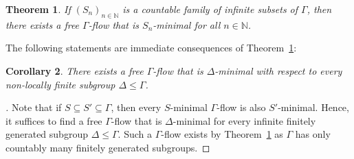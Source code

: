 \documentclass[11pt,reqno,psamsfonts]{amsart}
\theoremstyle{bfnote}
\newtheorem{theo}{Theorem}[section]
\newtheorem{corl}[theo]{Corollary}
\theoremstyle{definition}
\theoremstyle{remark}
\newcommand{\0}{\varnothing}
\renewcommand{\leq}{\leqslant}
\newcommand{\bemph}[1]{{\normalfont#1}}
\newcommand{\ep}[1]{\bemph{(}#1\bemph{)}}
\newcommand{\emphd}[1]{{\fontseries{b}\selectfont\textsf{#1}}}
\newcommand{\G}{\Gamma}
\newcommand{\N}{\mathbb{N}}
\numberwithin{equation}{section}
\newenvironment{scproof}[1][]{\begin{proof}[\textsc{\upshape{Proof}}#1]}{\end{proof}}
\begin{document}
    \begin{tcolorbox}
    \begin{theo}\label{theo:main}
        If $(S_n)_{n \in \N}$ is a countable family of infinite subsets of $\G$, then there exists a free $\G$-flow %
        that is $S_n$-minimal for all $n \in \N$.
    \end{theo}
    \end{tcolorbox}



    
    The following statements are immediate consequences of Theorem~\ref{theo:main}:

    \begin{tcolorbox}
    \begin{corl}\label{corl:fg_subgroups}
        There exists a free $\G$-flow %
        that is $\Delta$-minimal with respect to
        every non-locally finite subgroup $\Delta \leq \G$.
    \end{corl}
    \end{tcolorbox}
    \begin{scproof}
        Note that if $S \subseteq S' \subseteq \G$, then every $S$-minimal $\G$-flow is also $S'$-minimal. Hence, it suffices to find a free $\G$-flow %
        that is $\Delta$-minimal for every infinite {finitely generated} subgroup $\Delta \leq \G$. Such a $\G$-flow %
        exists by Theorem~\ref{theo:main} as $\G$ has only countably many finitely generated subgroups. %
    \end{scproof}
\end{document}
